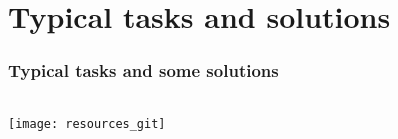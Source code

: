 \section{Typical tasks and solutions}


\begin{frame}
  \frametitle{Typical tasks and some solutions}

  \begin{columns}
    \begin{column}{0.45\textwidth}
      \hspace{0.\hsize}\texttt{[image: resources\_git]}
    \end{column}
    \begin{column}{0.55\textwidth}
    \end{column}
  \end{columns}

\end{frame}
